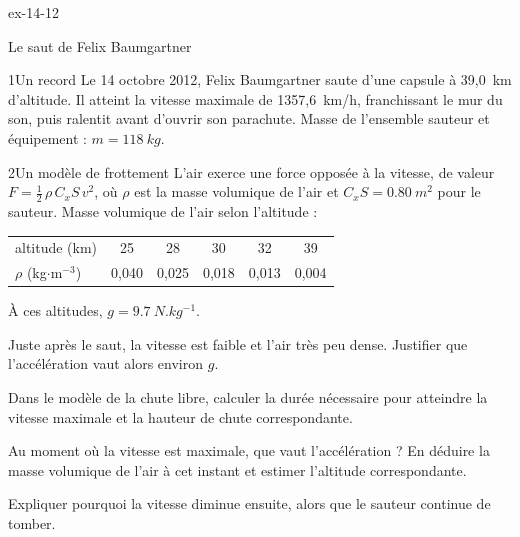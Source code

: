 \begin{blocLivre}{ex-14-12}
\begin{exercice}[3]{Le saut de Felix Baumgartner}
\begin{docu}{1}{Un record}
Le 14 octobre 2012, Felix Baumgartner saute d'une capsule à 39,0~km d'altitude. Il atteint la vitesse maximale de
1357,6~km/h, franchissant le mur du son, puis ralentit avant d'ouvrir son parachute. Masse de l'ensemble sauteur et
équipement : $m=\qty{118}{kg}$.
\end{docu}
\begin{docu}{2}{Un modèle de frottement}
L'air exerce une force opposée à la vitesse, de valeur $F=\frac12\,\rho\,C_x S\,v^2$, où $\rho$ est la masse volumique de
l'air et $C_x S=\qty{0,80}{m^2}$ pour le sauteur. Masse volumique de l'air selon l'altitude :
\par\smallskip
{\small\renewcommand{\arraystretch}{1.2}
\begin{tabular}{@{}l*{5}{c}@{}}\toprule
altitude (km) & 25 & 28 & 30 & 32 & 39\\
$\rho$ (kg$\cdot$m$^{-3}$) & 0,040 & 0,025 & 0,018 & 0,013 & 0,004\\\bottomrule
\end{tabular}}
\end{docu}
\begin{donnees}
À ces altitudes, $g=\qty{9,7}{N.kg^{-1}}$.
\end{donnees}
\begin{questions}
\item Juste après le saut, la vitesse est faible et l'air très peu dense. Justifier que l'accélération vaut alors
environ $g$.
\item Dans le modèle de la chute libre, calculer la durée nécessaire pour atteindre la vitesse maximale et la hauteur
de chute correspondante.
\item \initiative Au moment où la vitesse est maximale, que vaut l'accélération ? En déduire la masse volumique de l'air
à cet instant et estimer l'altitude correspondante.
\item Expliquer pourquoi la vitesse diminue ensuite, alors que le sauteur continue de tomber.
\end{questions}
\end{exercice}
\end{blocLivre}
